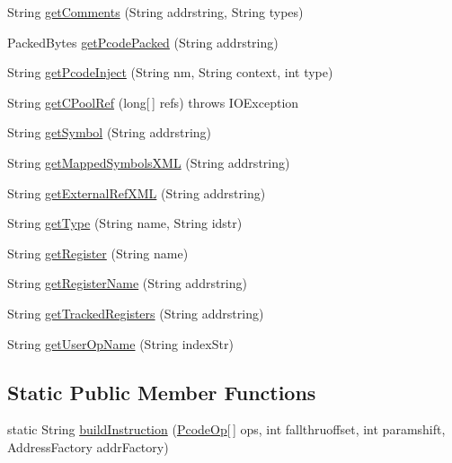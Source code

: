 \begin{DoxyCompactItemize}
\item 
String \mbox{\hyperlink{classghidra_1_1app_1_1decompiler_1_1_decompile_callback_a4d424166efdabe663d16e4cd27e76db3}{get\+Comments}} (String addrstring, String types)
\item 
Packed\+Bytes \mbox{\hyperlink{classghidra_1_1app_1_1decompiler_1_1_decompile_callback_ad121a6b6161280d72577fdf455fd26ac}{get\+Pcode\+Packed}} (String addrstring)
\item 
String \mbox{\hyperlink{classghidra_1_1app_1_1decompiler_1_1_decompile_callback_a190b9fe1770fb3c9100dd88653820023}{get\+Pcode\+Inject}} (String nm, String context, int type)
\item 
String \mbox{\hyperlink{classghidra_1_1app_1_1decompiler_1_1_decompile_callback_a238684d11918f682f50c0636f0a467ad}{get\+C\+Pool\+Ref}} (long\mbox{[}$\,$\mbox{]} refs)  throws I\+O\+Exception 
\item 
String \mbox{\hyperlink{classghidra_1_1app_1_1decompiler_1_1_decompile_callback_a939cb3e41e07c4fb43bdfef6ddb615df}{get\+Symbol}} (String addrstring)
\item 
String \mbox{\hyperlink{classghidra_1_1app_1_1decompiler_1_1_decompile_callback_aa74b281b85dd31d2edb2b70bd5b0744f}{get\+Mapped\+Symbols\+X\+ML}} (String addrstring)
\item 
String \mbox{\hyperlink{classghidra_1_1app_1_1decompiler_1_1_decompile_callback_aa4c3b43fc7a4d06423c965fafdda81a2}{get\+External\+Ref\+X\+ML}} (String addrstring)
\item 
String \mbox{\hyperlink{classghidra_1_1app_1_1decompiler_1_1_decompile_callback_a6c420b7effd79c8fc02da2156f876dcc}{get\+Type}} (String name, String idstr)
\item 
String \mbox{\hyperlink{classghidra_1_1app_1_1decompiler_1_1_decompile_callback_abc9fc80436baf9487eab631253db920f}{get\+Register}} (String name)
\item 
String \mbox{\hyperlink{classghidra_1_1app_1_1decompiler_1_1_decompile_callback_ad51f66c28eeca53ef3fc87faf289c76c}{get\+Register\+Name}} (String addrstring)
\item 
String \mbox{\hyperlink{classghidra_1_1app_1_1decompiler_1_1_decompile_callback_a029ff53ae77f771cf7e3311c435a98fa}{get\+Tracked\+Registers}} (String addrstring)
\item 
String \mbox{\hyperlink{classghidra_1_1app_1_1decompiler_1_1_decompile_callback_a53e9fbea2f4fe1888ecb423802d0395c}{get\+User\+Op\+Name}} (String index\+Str)
\end{DoxyCompactItemize}
\subsection*{Static Public Member Functions}
\begin{DoxyCompactItemize}
\item 
static String \mbox{\hyperlink{classghidra_1_1app_1_1decompiler_1_1_decompile_callback_a4551fa26e2b4264540bcbe680d87c2a7}{build\+Instruction}} (\mbox{\hyperlink{class_pcode_op}{Pcode\+Op}}\mbox{[}$\,$\mbox{]} ops, int fallthruoffset, int paramshift, Address\+Factory addr\+Factory)
\end{DoxyCompactItemize}


